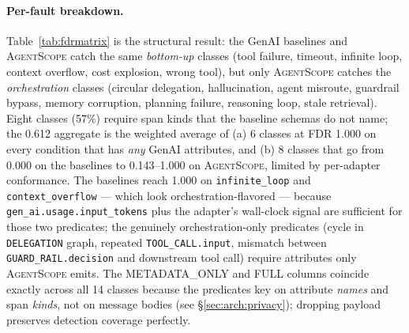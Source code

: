 \documentclass[sigplan,10pt,anonymous,review]{acmart}
\newcommand{\sysname}{\textsc{AgentScope}\xspace}
\begin{document}
\paragraph{Per-fault breakdown.} Table~\ref{tab:fdrmatrix} is the
structural result: the GenAI baselines and \sysname catch the same
\emph{bottom-up} classes (tool failure, timeout, infinite loop,
context overflow, cost explosion, wrong tool), but only \sysname
catches the \emph{orchestration} classes (circular delegation,
hallucination, agent misroute, guardrail bypass, memory corruption,
planning failure, reasoning loop, stale retrieval). Eight classes
(57\%) require span kinds that the baseline schemas do not name; the
0.612 aggregate is the weighted average of (a) 6 classes at FDR 1.000
on every condition that has \emph{any} GenAI attributes, and (b) 8
classes that go from 0.000 on the baselines to 0.143--1.000 on \sysname,
limited by per-adapter conformance. The baselines reach 1.000 on
\texttt{infinite\_loop} and \texttt{context\_overflow} --- which look
orchestration-flavored --- because \texttt{gen\_ai.usage.input\_tokens}
plus the adapter's wall-clock signal are sufficient for those two
predicates; the genuinely orchestration-only predicates (cycle in
\texttt{DELEGATION} graph, repeated \texttt{TOOL\_CALL.input},
mismatch between \texttt{GUARD\_RAIL.decision} and downstream tool
call) require attributes only \sysname{} emits. The METADATA\_ONLY and
FULL columns coincide exactly across all 14 classes because the
predicates key on attribute \emph{names} and span \emph{kinds}, not on
message bodies (see \S\ref{sec:arch:privacy}); dropping payload
preserves detection coverage perfectly.
\end{document}
